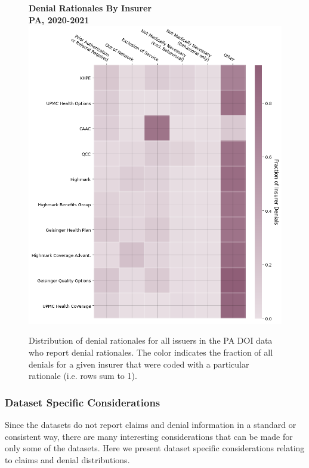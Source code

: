 \documentclass[12pt, a4paper,twoside,parskip=full]{report}
\theoremstyle{plain} %
\theoremstyle{definition} %
\theoremstyle{remark} %
\numberwithin{equation}{chapter}
\begin{document}
		
		\begin{figure}[h!]
			\centering
			\textbf{Denial Rationales By Insurer}\\
			\textbf{PA, 2020-2021}\\
			\includegraphics[width=\columnwidth]{images/pa_claims/insurer_vs_denial_cat.png}
			\caption{Distribution of denial rationales for all issuers in the PA DOI data who report denial rationales. The color indicates the fraction of all denials for a given insurer that were coded with a particular rationale (i.e. rows sum to 1).}
			\label{padenialrationalesbyinsurer}
		\end{figure}
		
		\clearpage
		
		
		
		\subsubsection{Dataset Specific Considerations}
		
		Since the datasets do not report claims and denial information in a standard or consistent way, there are many interesting considerations that can be made for only some of the datasets. Here we present dataset specific considerations relating to claims and denial distributions.
		
\end{document}
